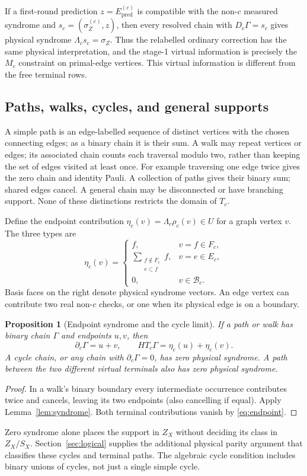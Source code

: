 \documentclass[11pt]{article}
\theoremstyle{definition}
\theoremstyle{plain}
\newtheorem{proposition}[definition]{Proposition}
\theoremstyle{remark}
\newcommand{\pred}{\mathrm{pred}}
\begin{document}
If a first-round prediction $z=E_{\pred}^{(c)}$ is compatible with
the non-$c$ measured syndrome and $s_c=(\sigma_Z^{(c)},z)$, then every
resolved chain with $D_c\Gamma=s_c$ gives physical syndrome
$\Lambda_cs_c=\sigma_Z$. Thus the relabelled ordinary correction has
the same physical interpretation, and the stage-1 virtual information
is precisely the $M_c$ constraint on primal-edge vertices.
This virtual information is different from the free terminal rows.

\subsection{Paths, walks, cycles, and general supports}\label{sec:paths}
A simple path is an edge-labelled sequence of distinct vertices with
the chosen connecting edges; as a binary chain it is their sum.
A walk may repeat vertices or edges; its associated chain counts
each traversal modulo two, rather than keeping the set of edges visited
at least once. For example traversing one edge twice gives the zero
chain and identity Pauli. A collection of paths gives their binary sum;
shared edges cancel. A general chain may be disconnected or have
branching support. None of these distinctions restricts the domain of
$T_c$.

Define the endpoint contribution
$\eta_c(v)=\Lambda_c\rho_c(v)\in U$ for a graph vertex $v$.
The three types are
\begin{equation}
 \eta_c(v)=
 \begin{cases}
 f,&v=f\in F_c,\\
 \displaystyle\sum_{\substack{f\notin F_c\\e\subset f}}f,
       &v=e\in E_c,\\
 0,&v\in\mathcal B_c .
 \end{cases}                                                  \label{eq:endpoint}
\end{equation}
Basis faces on the right denote physical syndrome vectors.
An edge vertex can contribute two real non-$c$ checks, or one when
its physical edge is on a boundary.

\begin{proposition}[Endpoint syndrome and the cycle limit]
\label{prop:paths}
If a path or walk has binary chain $\Gamma$ and endpoints $u,v$,
then
\[
 \partial_c\Gamma=u+v,\qquad
 H T_c\Gamma=\eta_c(u)+\eta_c(v).
\]
A cycle chain, or any chain with $\partial_c\Gamma=0$, has zero
physical syndrome. A path between the two different virtual terminals
also has zero physical syndrome.
\end{proposition}
\begin{proof}
In a walk's binary boundary every intermediate occurrence contributes
twice and cancels, leaving its two endpoints (also cancelling if equal).
Apply Lemma~\ref{lem:syndrome}. Both terminal contributions vanish by
\eqref{eq:endpoint}.
\end{proof}
Zero syndrome alone places the support in $Z_X$ without deciding its
class in $Z_X/S_X$. Section~\ref{sec:logical} supplies the additional
physical parity argument that classifies these cycles and terminal paths.
The algebraic cycle condition includes binary unions of cycles, not
just a single simple cycle.
\end{document}
